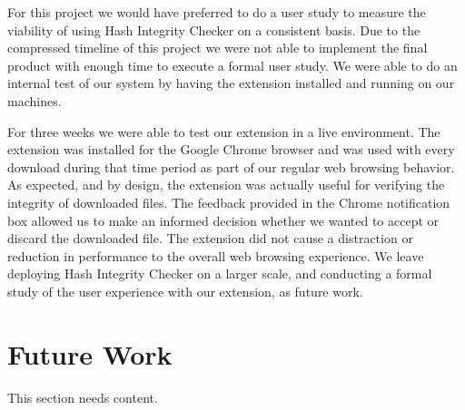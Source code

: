\documentclass[letterpaper,twocolumn,10pt]{article}
\begin{document}
For this project we would have preferred to do a user study to measure the viability of using Hash Integrity Checker on a consistent basis. Due to the compressed timeline of this project we were not able to implement the final product with enough time to execute a formal user study. We were able to do an internal test of our system by having the extension installed and running on our machines.

For three weeks we were able to test our extension in a live environment. The extension was installed for the Google Chrome browser and was used with every download during that time period as part of our regular web browsing behavior. As expected, and by design, the extension was actually useful for verifying the integrity of downloaded files. The feedback provided in the Chrome notification box allowed us to make an informed decision whether we wanted to accept or discard the downloaded file. The extension did not cause a distraction or reduction in performance to the overall web browsing experience. We leave deploying Hash Integrity Checker on a larger scale, and conducting a formal study of the user experience with our extension, as future work.

\section{Future Work}

This section needs content.

{\footnotesize 
}
\end{document}
